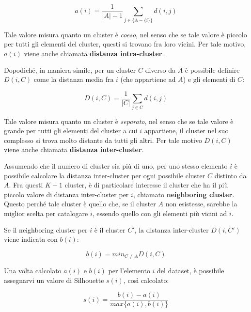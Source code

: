 \documentclass[a4paper, 12pt]{report}
\begin{document}
			\begin{equation}
				a(i) = \frac{1}{|A| - 1} \sum_{j \in \{A - \{i\}\}} d(i, j)
			\end{equation}

			Tale valore misura quanto un cluster è \textit{coeso}, nel senso
			che se tale valore è piccolo per tutti gli elementi del cluster,
			questi si trovano fra loro vicini. Per tale motivo, $a(i)$ viene
			anche chiamata \textbf{distanza intra-cluster}.

			Dopodiché, in maniera simile, per un cluster $C$ diverso da $A$
			è possibile definire $D(i, C)$ come la distanza media fra $i$
			(che appartiene ad $A$) e gli elementi di $C$:

			\begin{equation*}
				D(i, C) = \frac{1}{|C|} \sum_{j \in C} d(i, j)
			\end{equation*}

			Tale valore misura quanto un cluster è \textit{separato}, nel senso
			che se tale valore è grande per tutti gli elementi del cluster a cui
			$i$ appartiene, il cluster nel suo complesso si trova molto distante
			da tutti gli altri. Per tale motivo $D(i, C)$ viene anche chiamata
			\textbf{distanza inter-cluster}.

			Assumendo che il numero di cluster sia più di uno, per uno stesso elemento
			$i$ è possibile calcolare la distanza inter-cluster per ogni possibile
			cluster $C$ distinto da $A$. Fra questi $K - 1$ cluster, è di particolare
			interesse il cluster che ha il più piccolo valore di distanza inter-cluster
			per $i$, chiamato \textbf{neighboring cluster}. Questo perché tale cluster
			è quello che, se il cluster $A$ non esistesse, sarebbe la miglior scelta
			per catalogare $i$, essendo quello con gli elementi più vicini ad $i$.

			Se il neighboring cluster per $i$ è il cluster $C'$, la distanza
			inter-cluster $D(i, C')$ viene indicata con $b(i)$:

			\begin{equation}
				b(i) = min_{C \neq A} D(i, C)
			\end{equation}

			Una volta calcolato $a(i)$ e $b(i)$ per l'elemento $i$ del dataset, è
			possibile assegnarvi un valore di Silhouette $s(i)$, così calcolato:

			\begin{equation}
				s(i) = \frac{b(i) - a(i)}{max\{a(i), b(i)\}}
			\end{equation}
\end{document}
